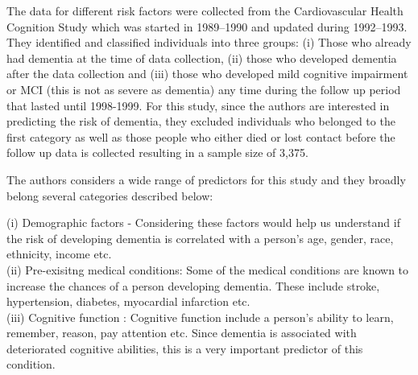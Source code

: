 \documentclass[12pt,letterpaper]{article}
\begin{document}
The data for different risk factors were collected from the Cardiovascular Health Cognition Study which was started in 1989–1990 and updated during 1992–1993. They identified and classified individuals into three groups: (i) Those who already had dementia at the time of data collection, (ii) those who developed dementia after the data collection and (iii) those who developed mild cognitive impairment or MCI (this is not as severe as dementia) any time during the follow up period that lasted until 1998-1999. For this study, since the authors are interested in predicting the risk of dementia, they excluded individuals who belonged to the first category as well as those people who either died or lost contact before the follow up data is collected resulting in a sample size of 3,375. 

The authors considers a wide range of predictors for this study and they broadly belong several categories described below:

(i) Demographic factors - Considering these factors would help us understand if the risk of developing dementia is correlated with a person's age, gender, race, ethnicity, income etc.\\
(ii) Pre-exisitng medical conditions: Some of the medical conditions are known to increase the chances of a person developing dementia. These include stroke, hypertension, diabetes, myocardial infarction etc. \\
(iii)  Cognitive function : Cognitive function include a person's ability to learn, remember, reason, pay attention etc.  Since dementia is associated with deteriorated cognitive abilities, this is a very important predictor of this condition. \\
\end{document}
